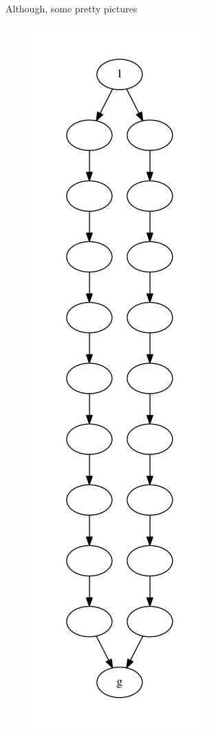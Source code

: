 \documentclass{beamer}
\begin{document}
{

\begin{frame}{Although, some pretty pictures}
\begin{figure}
	\hfill
	\includegraphics[height=.9\textheight]{figure/patterns/pattern1}

\end{figure}
\end{frame}}
\end{document}
